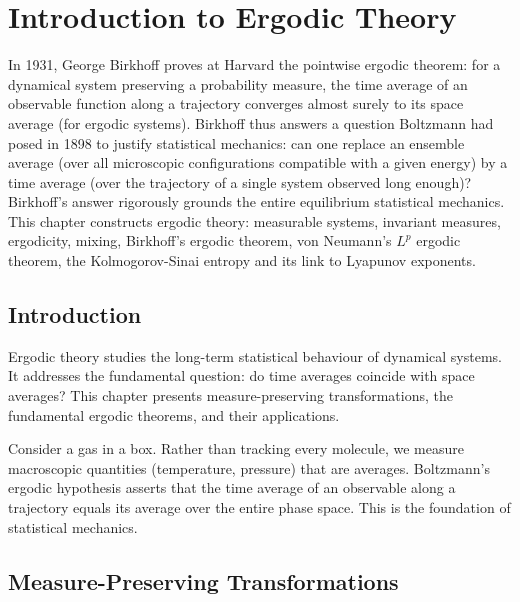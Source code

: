 \chapter{Introduction to Ergodic Theory}
\label{ch:ergodic}

In 1931, George Birkhoff proves at Harvard the pointwise ergodic theorem: for a dynamical system preserving a probability measure, the time average of an observable function along a trajectory converges almost surely to its space average (for ergodic systems). Birkhoff thus answers a question Boltzmann had posed in 1898 to justify statistical mechanics: can one replace an ensemble average (over all microscopic configurations compatible with a given energy) by a time average (over the trajectory of a single system observed long enough)? Birkhoff's answer rigorously grounds the entire equilibrium statistical mechanics. This chapter constructs ergodic theory: measurable systems, invariant measures, ergodicity, mixing, Birkhoff's ergodic theorem, von Neumann's $L^p$ ergodic theorem, the Kolmogorov-Sinai entropy and its link to Lyapunov exponents.

\section{Introduction}

Ergodic theory studies the long-term statistical
behaviour of dynamical systems. It addresses the fundamental question: do
time averages coincide with space averages? This chapter presents
measure-preserving transformations, the fundamental ergodic theorems, and
their applications.

\begin{intuition}
Consider a gas in a box. Rather than tracking every molecule, we measure
macroscopic quantities (temperature, pressure) that are averages. Boltzmann's
ergodic hypothesis asserts that the time average of an observable along a
trajectory equals its average over the entire phase space. This is the
foundation of statistical mechanics.
\end{intuition}

\section{Measure-Preserving Transformations}


